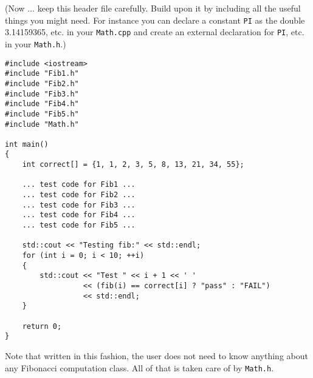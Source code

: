 (Now ... keep this header file carefully. Build upon it by including all the useful things you might need.
For instance you can declare a constant \verb!PI! as the double 3.14159365, etc. in your \texttt{Math.cpp} and
create an external declaration for \verb!PI!, etc. in your \texttt{Math.h}.)

\begin{Verbatim}[frame=single]
#include <iostream>
#include "Fib1.h"
#include "Fib2.h"
#include "Fib3.h"
#include "Fib4.h"
#include "Fib5.h"
#include "Math.h"

int main()
{
    int correct[] = {1, 1, 2, 3, 5, 8, 13, 21, 34, 55};

    ... test code for Fib1 ...
    ... test code for Fib2 ...
    ... test code for Fib3 ...
    ... test code for Fib4 ...
    ... test code for Fib5 ...

    std::cout << "Testing fib:" << std::endl;
    for (int i = 0; i < 10; ++i)
    {
        std::cout << "Test " << i + 1 << ' '
                  << (fib(i) == correct[i] ? "pass" : "FAIL")
                  << std::endl;
    }

    return 0;
}
\end{Verbatim}

Note that written in this fashion, the user does not need to know anything
about any Fibonacci
computation class. All of that is taken care of by \texttt{Math.h}.



